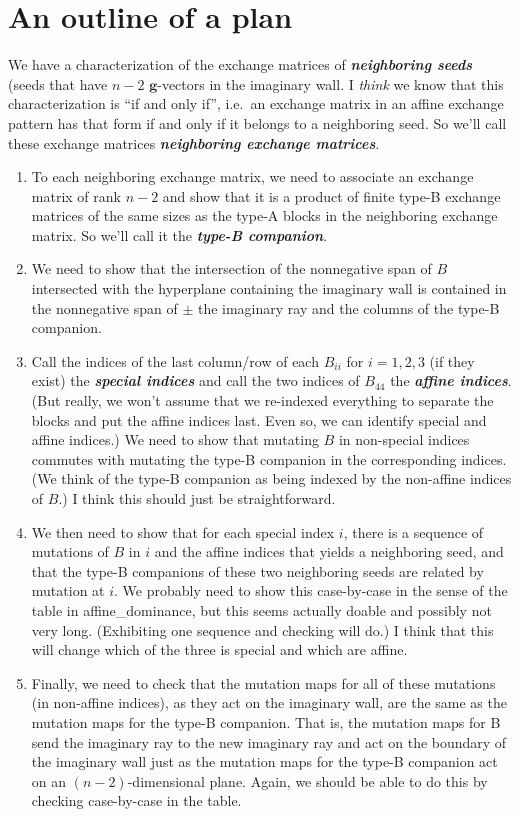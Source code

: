 \documentclass{amsart}
\theoremstyle{definition}
\theoremstyle{remark}
\numberwithin{equation}{section}
\newcommand{\newword}[1]{\textbf{\emph{#1}}}
\newcommand{\0}{{\mathbf{0}}}
\newcommand{\g}{\mathbf{g}}
\begin{document}
\section{An outline of a plan}
We have a characterization of the exchange matrices of \newword{neighboring seeds} (seeds that have $n-2$ $\g$-vectors in the imaginary wall.
I \emph{think} we know that this characterization is ``if and only if'', i.e.\ an exchange matrix in an affine exchange pattern has that form if and only if it belongs to a neighboring seed.
So we'll call these exchange matrices \newword{neighboring exchange matrices}.

\begin{enumerate}[\bf1.]
\item
To each neighboring exchange matrix, we need to associate an exchange matrix of rank $n-2$ and show that it is a product of finite type-B exchange matrices of the same sizes as the type-A blocks in the neighboring exchange matrix.
So we'll call it the \newword{type-B companion}.
\item
We need to show that the intersection of the nonnegative span of $B$ intersected with the hyperplane containing the imaginary wall is contained in the nonnegative span of $\pm$ the imaginary ray and the columns of the type-B companion.
\item
Call the indices of the last column/row of each $B_{ii}$ for $i=1,2,3$ (if they exist) the \newword{special indices} and call the two indices of $B_{44}$ the \newword{affine indices}.
(But really, we won't assume that we re-indexed everything to separate the blocks and put the affine indices last.
Even so, we can identify special and affine indices.)
We need to show that mutating $B$ in non-special indices commutes with mutating the type-B companion in the corresponding indices.
(We think of the type-B companion as being indexed by the non-affine indices of $B$.)
I think this should just be straightforward.
\item \label{not finally}
We then need to show that for each special index $i$, there is a sequence of mutations of $B$ in $i$ and the affine indices that yields a neighboring seed, and that the type-B companions of these two neighboring seeds are related by mutation at $i$.
We probably need to show this case-by-case in the sense of the table in affine\_dominance, but this seems actually doable and possibly not very long.  
(Exhibiting one sequence and checking will do.)
I think that this will change which of the three is special and which are affine.
\item \label{finally}
Finally, we need to check that the mutation maps for all of these mutations (in non-affine indices), as they act on the imaginary wall, are the same as the mutation maps for the type-B companion.
That is, the mutation maps for B send the imaginary ray to the new imaginary ray and act on the boundary of the imaginary wall just as the mutation maps for the type-B companion act on an $(n-2)$-dimensional plane.
Again, we should be able to do this by checking case-by-case in the table.
\end{enumerate}
\end{document}
